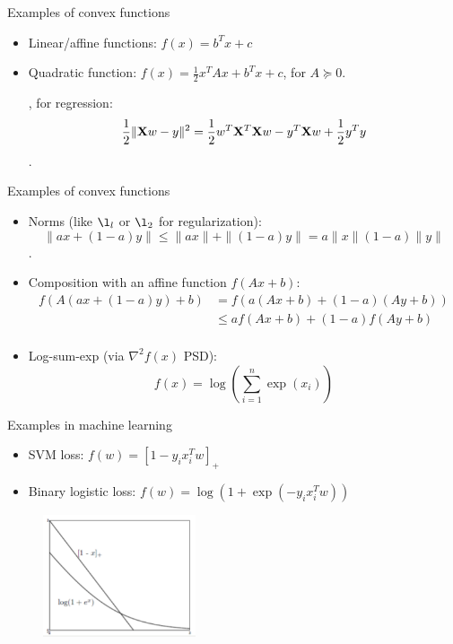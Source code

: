 \documentclass[draft]{beamer}
\begin{document}
\begin{frame}
	{Examples of convex functions} 
	\begin{itemize}
		\item Linear/affine functions: $f(x)=b^Tx +c$ 
		\item Quadratic function: $f(x)=\frac{1}{2}x^TAx+b^Tx+c $, for $A\succeq 0$. 
		
		\eg, for regression:  \[\frac{1}{2}\|\mathbf{X} w-y\|^2 = \frac{1}{2} w^{T} \mathbf{X} ^T \mathbf{X} w -y^T \mathbf{X} w + \frac{1}{2} y^T y \].
		 
	\end{itemize}
\end{frame}
\begin{frame}
	{Examples of convex functions} 
	\begin{itemize}
		 
		\item Norms (like $\l_l$ or $\l_2$ for regularization): 
		\[ \|ax+(1-a)y\|\le \|ax\| +\|(1-a)y\| = a\|x\| (1-a) \|y\| \]. 
		\item Composition with an affine function $f(Ax+b)$: 
		\begin{equation*}
			\begin{aligned}
				f(A(ax+(1-a)y)+b) & = f( a(Ax+b) + (1-a) (Ay+b)) \\
				& \le af(Ax+b) + (1-a) f(Ay+b) \\ 
			\end{aligned}
		\end{equation*} 
		\item Log-sum-exp (via $\nabla^2 f(x)$ PSD): $$f(x)=\log \left(\sum_{i=1}^{n} \exp(x_i) \right)$$		 
	\end{itemize}
\end{frame}

\begin{frame}
	{Examples in machine learning} 
	\begin{itemize}
		\item SVM loss: $f(w) = [1-y_i x_i^T w]_+ $
		\item Binary logistic loss: $f(w)=\log ( 1+ \exp ( -y_i  x_i ^T w ))$ 
	\end{itemize}
	\begin{figure}
		\includegraphics[width=0.4\textwidth]{2018-03-05-11-53-58.png} 
		\end{figure}
	
\end{frame}
\end{document}
